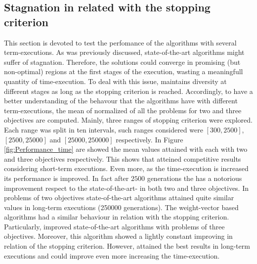\subsection{Stagnation in \MOEAS{} related with the stopping criterion}


This section is devoted to test the perfomance of the algorithms with several term-executions.
%
As was previously discussed, state-of-the-art algorithms might suffer of stagnation.
%
Therefore, the solutions could converge in promising (but non-optimal) regions at the first stages of the execution, wasting a meaningfull quantity of time-execution.
%
To deal with this issue, \VSDMOEA{} maintains diversity at different stages as long as the stopping criterion is reached.
%
Accordingly, to have a better understanding of the behavour that the algorithms have with different term-executions, the mean of normalized \HV{} of all the problems for two and three objectives are computed.
%
Mainly, three ranges of stopping criterion were explored.
%
Each range was split in ten intervals, such ranges considered were $[300, 2500]$, $[2500, 25000]$ and $[25000, 250000]$ respectively.
%
In Figure \ref{fig:Performance_time} are showed the mean \HV{} values attained with each \MOEA{} with two and three objectives respectively.
%
This shows that \VSDMOEA{} atteined competitive results considering short-term executions.
%
Even more, as the time-execution is increased its performance is improved.
%
In fact after $2500$ generations the \VSDMOEA{} has a notorious improvement respect to the state-of-the-art-\MOEAS{} in both two and three objectives.
%
In problems of two objectives state-of-the-art algorithms attained quite similar \HV{} values in long-term executions (250000 generations).
%
The weight-vector based algorithms had a similar behaviour in relation with the stopping criterion.
%
Particularly, \RMOEA{} improved state-of-the-art algorithms with problems of three objectives.
%
Moreover, this algorithm showed a lightly constant improving in relation of the stopping criterion.
%
However, \VSDMOEA{} attained the best results in long-term executions and could improve even more increasing the time-execution.
%


